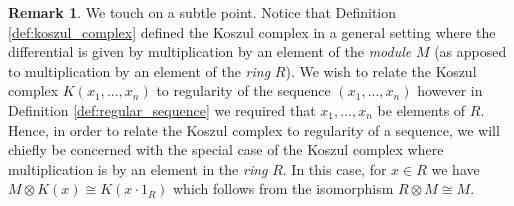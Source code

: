 \documentclass[12pt]{article}
\theoremstyle{plain}
\theoremstyle{definition}
\newtheorem{remark}[thm]{Remark}
\begin{document}
\begin{remark}\label{rmk:where_mult}
	We touch on a subtle point. Notice that Definition \ref{def:koszul_complex} defined the Koszul complex in a general setting where the differential is given by multiplication by an element of the \emph{module} $M$ (as apposed to multiplication by an element of the \emph{ring} $R$). We wish to relate the Koszul complex $K(x_1,...,x_n)$ to regularity of the sequence $(x_1,...,x_n)$ however in Definition \ref{def:regular_sequence} we required that $x_1,...,x_n$ be elements of $R$. Hence, in order to relate the Koszul complex to regularity of a sequence, we will chiefly be concerned with the special case of the Koszul complex where multiplication is by an element in the \emph{ring} $R$. In this case, for $x \in R$ we have $M \otimes K(x) \cong K(x\cdot 1_R)$ which follows from the isomorphism $R \otimes M \cong M$.
\end{remark}
\end{document}
